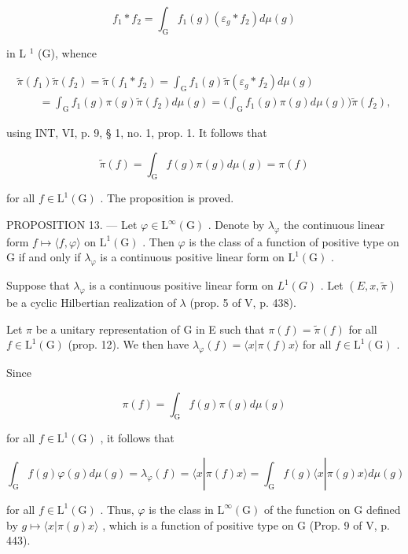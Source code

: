 \[
f _ {1} * f _ {2} = \int_ {\mathrm{G}} f _ {1} (g) (\varepsilon_ {g} * f _ {2}) d \mu (g)
\]

in L \(^{1}\) (G), whence

\[
\begin{array}{l} \widetilde {\pi} (f _ {1}) \widetilde {\pi} (f _ {2}) = \widetilde {\pi} (f _ {1} * f _ {2}) = \int_ {\mathrm{G}} f _ {1} (g) \widetilde {\pi} (\varepsilon_ {g} * f _ {2}) d \mu (g) \\ \qquad = \int_ {\mathrm{G}} f _ {1} (g) \pi (g) \widetilde {\pi} (f _ {2}) d \mu (g) = \Big (\int_ {\mathrm{G}} f _ {1} (g) \pi (g) d \mu (g) \Big) \widetilde {\pi} (f _ {2}), \end{array}
\]

using INT, VI, p. 9, § 1, no. 1, prop. 1. It follows that

\[
\widetilde {\pi} (f) = \int_ {\mathrm{G}} f (g) \pi (g) d \mu (g) = \pi (f)
\]

for all \(f \in \mathrm{L}^{1}(\mathrm{G})\) . The proposition is proved.

PROPOSITION 13. --- Let \(\varphi\in\mathrm{L}^{\infty}(\mathrm{G})\) . Denote by \(\lambda_{\varphi}\) the continuous linear form \(f\mapsto\langle f,\varphi\rangle\) on \(\mathrm{L}^{1}(\mathrm{G})\) . Then \(\varphi\) is the class of a function of positive type on G if and only if \(\lambda_{\varphi}\) is a continuous positive linear form on \(\mathrm{L}^{1}(\mathrm{G})\) .

Suppose that \(\lambda_{\varphi}\) is a continuous positive linear form on \(L^{1}(G)\) . Let \((E, x, \widetilde{\pi})\) be a cyclic Hilbertian realization of \(\lambda\) (prop. 5 of V, p. 438).

Let \(\pi\) be a unitary representation of G in E such that \(\pi(f) = \widetilde{\pi}(f)\) for all \(f \in \mathrm{L}^1(\mathrm{G})\) (prop. 12). We then have \(\lambda_{\varphi}(f) = \langle x | \pi(f)x \rangle\) for all \(f \in \mathrm{L}^1(\mathrm{G})\) .

Since

\[
\pi (f) = \int_ {\mathrm{G}} f (g) \pi (g) d \mu (g)
\]

for all \(f\in \mathrm{L}^1 (\mathrm{G})\) , it follows that

\[
\int_ {\mathrm{G}} f (g) \varphi (g) d \mu (g) = \lambda_ {\varphi} (f) = \langle x | \pi (f) x \rangle = \int_ {\mathrm{G}} f (g) \langle x | \pi (g) x \rangle d \mu (g)
\]

for all \(f \in \mathrm{L}^{1}(\mathrm{G})\) . Thus, \(\varphi\) is the class in \(\mathrm{L}^{\infty}(\mathrm{G})\) of the function on G defined by \(g \mapsto \langle x | \pi(g)x \rangle\) , which is a function of positive type on G (Prop. 9 of V, p. 443).

